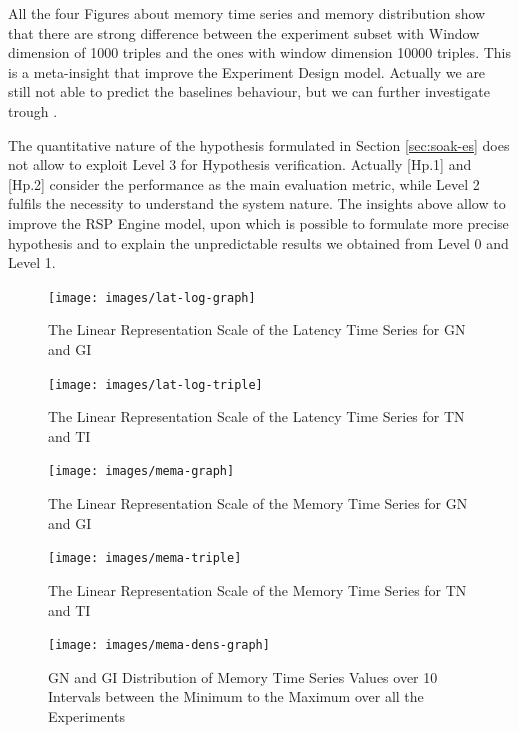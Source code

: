 All the four Figures about memory time series and memory distribution show that there are strong difference between the experiment subset with Window dimension of 1000  triples and the ones with window dimension 10000 triples. This is a meta-insight that improve the Experiment Design model. Actually we are still not able to predict the baselines behaviour, but we can further investigate trough \namens.

The quantitative nature of the hypothesis formulated in Section \ref{sec:soak-es} does not allow to exploit Level 3 for Hypothesis verification. Actually [Hp.1] and [Hp.2] consider the performance as the main evaluation metric, while Level 2 fulfils the necessity to understand the system nature. The insights above allow to improve the RSP Engine model, upon which is possible to formulate more precise hypothesis and to explain the unpredictable results we obtained from Level 0 and Level 1.

\begin{figure}[hbt]
  \centering
	\texttt{[image: images/lat-log-graph]}
	\caption{The Linear Representation Scale of the Latency Time Series for GN and GI} 
  	\label{fig:level2-latency-graph}
\end{figure}

\begin{figure}[hbt]
  \centering
	\texttt{[image: images/lat-log-triple]}
	\caption{The Linear Representation Scale of the Latency Time Series for TN and TI} 
  	\label{fig:level2-latency-triple}
\end{figure}


\begin{figure}[hbt]
  \centering
	\texttt{[image: images/mema-graph]}
	\caption{The Linear Representation Scale of the Memory Time Series for GN and GI} 
  	\label{fig:level2-memory-graph}
\end{figure}

\begin{figure}[hbt]
  \centering
	\texttt{[image: images/mema-triple]}
	\caption{The Linear Representation Scale of the Memory Time Series for TN and TI} 
  	\label{fig:level2-memory-triple}
\end{figure}

\begin{figure}[hbt]
  \centering
	\texttt{[image: images/mema-dens-graph]}
	\caption{GN and GI Distribution of Memory Time Series Values over 10 Intervals between the Minimum to the Maximum over all the Experiments} 
  	\label{fig:level2-memory-density-graph}
\end{figure}

